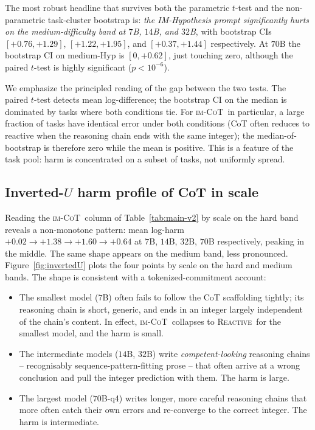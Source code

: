 \documentclass[11pt]{article}
\newcommand{\imcot}{\textsc{im-CoT}}
\newcommand{\reactive}{\textsc{Reactive}}
\begin{document}
The most robust headline that survives both the parametric
$t$-test and the non-parametric task-cluster bootstrap is:
\emph{the IM-Hypothesis prompt significantly hurts on the
medium-difficulty band at $7$B, $14$B, and $32$B}, with bootstrap
CIs $[+0.76,+1.29]$, $[+1.22,+1.95]$, and $[+0.37,+1.44]$
respectively.  At $70$B the bootstrap CI on medium-Hyp is
$[0,+0.62]$, just touching zero, although the paired $t$-test is
highly significant ($p < 10^{-6}$).

We emphasize the principled reading of the gap between the two
tests.  The paired $t$-test detects mean log-difference; the
bootstrap CI on the median is dominated by tasks where both
conditions tie.  For \imcot\ in particular, a large fraction of
tasks have identical error under both conditions (CoT often
reduces to reactive when the reasoning chain ends with the same
integer); the median-of-bootstrap is therefore zero while the
mean is positive.  This is a feature of the task pool: harm is
concentrated on a subset of tasks, not uniformly spread.

\subsection{Inverted-$U$ harm profile of CoT in scale}
\label{sec:cot-inverted-u}

Reading the \imcot\ column of Table~\ref{tab:main-v2} by scale on
the hard band reveals a non-monotone pattern:  mean log-harm
$+0.02 \to +1.38 \to +1.60 \to +0.64$ at $7$B, $14$B, $32$B,
$70$B respectively, peaking in the middle.  The same shape appears
on the medium band, less pronounced.  Figure~\ref{fig:invertedU}
plots the four points by scale on the hard and medium bands.
The shape is consistent with a tokenized-commitment account:

\begin{itemize}[leftmargin=2em,itemsep=0pt,topsep=2pt]
\item The smallest model ($7$B) often fails to follow the CoT
  scaffolding tightly; its reasoning chain is short, generic, and
  ends in an integer largely independent of the chain's content.
  In effect, \imcot\ collapses to \reactive\ for the smallest
  model, and the harm is small.

\item The intermediate models ($14$B, $32$B) write
  \emph{competent-looking} reasoning chains -- recognisably
  sequence-pattern-fitting prose -- that often arrive at a wrong
  conclusion and pull the integer prediction with them.  The
  harm is large.

\item The largest model ($70$B-q4) writes longer, more careful
  reasoning chains that more often catch their own errors and
  re-converge to the correct integer.  The harm is intermediate.
\end{itemize}
\end{document}

